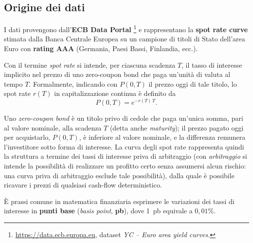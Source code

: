 \documentclass[11pt,a4paper]{article}
\theoremstyle{plain}
\theoremstyle{definition}
\theoremstyle{remark}
\begin{document}
\subsection{Origine dei dati}
\label{sec:origine-dati}

I dati provengono dall'\textbf{ECB Data Portal}%
\footnote{\url{https://data.ecb.europa.eu}, dataset \emph{YC -- Euro area yield curves}.}
e rappresentano la \textbf{spot rate curve} stimata dalla Banca Centrale Europea
su un campione di titoli di Stato dell'area Euro con \textbf{rating AAA}
(Germania, Paesi Bassi, Finlandia, ecc.). 

Con il termine \emph{spot rate} si intende, per ciascuna scadenza $T$, il tasso
di interesse implicito nel prezzo di uno zero-coupon bond che paga un'unità di
valuta al tempo $T$. Formalmente, indicando con $P(0,T)$ il prezzo oggi di tale
titolo, lo spot rate $r(T)$ in capitalizzazione continua è definito da
\[
P(0,T) = e^{-r(T) \, T}.
\]

Uno \emph{zero-coupon bond} è un titolo privo di cedole che paga un'unica somma,
pari al valore nominale, alla scadenza $T$ (detta anche \emph{maturity}); il
prezzo pagato oggi per acquistarlo, $P(0,T)$, è inferiore al valore nominale, e la
differenza remunera l'investitore sotto forma di interesse.
La curva degli spot rate rappresenta quindi la struttura a termine dei tassi
di interesse priva di arbitraggio (con \emph{arbitraggio} si intende la
possibilità di realizzare un profitto certo senza assumersi alcun rischio: una
curva priva di arbitraggio esclude tale possibilità), dalla quale è possibile
ricavare i prezzi di qualsiasi cash-flow deterministico.


È prassi comune in matematica finanziaria esprimere le variazioni dei tassi di
interesse in \textbf{punti base} (\emph{basis point}, \textbf{pb}), dove 1~pb
equivale a $0{,}01\%$.

\end{document}
